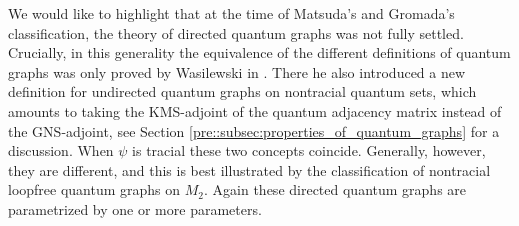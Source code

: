 \documentclass{amsart}
\begin{document}
We would like to highlight that at the time of Matsuda's and Gromada's classification, the theory of directed quantum graphs was not fully settled. Crucially, in this generality the equivalence of the different definitions of quantum graphs was only proved by Wasilewski in \cite{wasilewski_quantum_2024}. There he also introduced a new definition for undirected quantum graphs on nontracial quantum sets, which amounts to taking the KMS-adjoint of the quantum adjacency matrix instead of the GNS-adjoint, see Section \ref{pre::subsec:properties_of_quantum_graphs} for a discussion. When $\psi$ is tracial these two concepts coincide. Generally, however, they are different, and this is best illustrated by the classification of nontracial loopfree quantum graphs on $M_2$. Again these directed quantum graphs are parametrized by one or more parameters.
\end{document}
